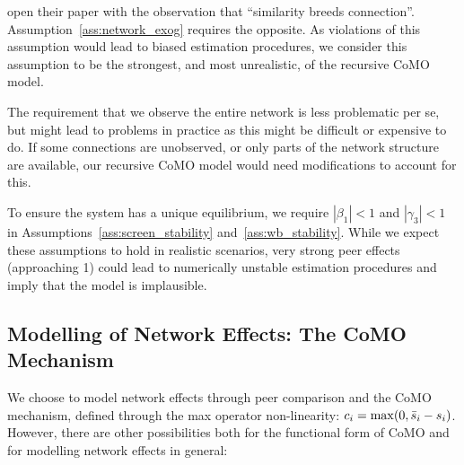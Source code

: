 \textcite[p.~415]{McPherson2001} open their paper with the observation that ``similarity breeds connection''. Assumption~\ref{ass:network_exog} requires the opposite. As violations of this assumption would lead to biased estimation procedures, we consider this assumption to be the strongest, and most unrealistic, of the recursive CoMO model.

The requirement that we observe the entire network is less problematic per se, but might lead to problems in practice as this might be difficult or expensive to do. If some connections are unobserved, or only parts of the network structure are available, our recursive CoMO model would need modifications to account for this.

To ensure the system has a unique equilibrium, we require $|\beta_1| < 1$ and $|\gamma_3| < 1$ in Assumptions~\ref{ass:screen_stability} and~\ref{ass:wb_stability}. While we expect these assumptions to hold in realistic scenarios, very strong peer effects (approaching 1) could lead to numerically unstable estimation procedures and imply that the model is implausible.

\subsection{Modelling of Network Effects: The CoMO Mechanism}

We choose to model network effects through peer comparison and the CoMO mechanism, defined through the max operator non-linearity: $c_i = \max(0, \bar{s}_i - s_i)$. However, there are other possibilities both for the functional form of CoMO and for modelling network effects in general:

